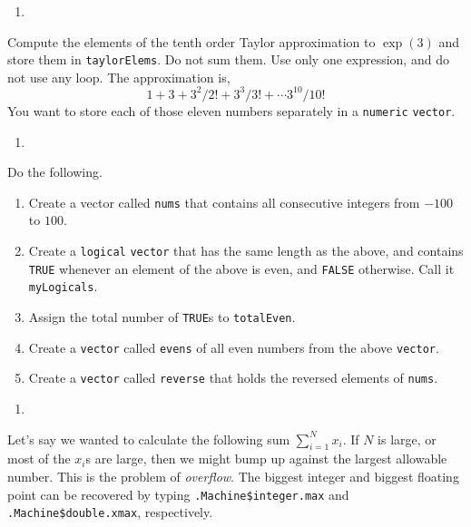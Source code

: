 \documentclass[
  12pt,
  krantz2]{krantz}
\providecommand{\tightlist}{%
  \setlength{\itemsep}{0pt}\setlength{\parskip}{0pt}}
\begin{document}
\begin{enumerate}
\def\labelenumi{\arabic{enumi}.}
\setcounter{enumi}{1}
\tightlist
\item
\end{enumerate}

Compute the elements of the tenth order Taylor approximation to \(\exp(3)\) and store them in \texttt{taylorElems}. Do not sum them. Use only one expression, and do not use any loop. The approximation is,\\
\[
1 + 3 + 3^2/2! + 3^3/3! + \cdots 3^{10}/10!
\]
You want to store each of those eleven numbers separately in a \texttt{numeric} \texttt{vector}.

\begin{enumerate}
\def\labelenumi{\arabic{enumi}.}
\setcounter{enumi}{2}
\tightlist
\item
\end{enumerate}

Do the following.

\begin{enumerate}
\def\labelenumi{\alph{enumi})}
\tightlist
\item
  Create a vector called \texttt{nums} that contains all consecutive integers from \(-100\) to \(100\).
\item
  Create a \texttt{logical} \texttt{vector} that has the same length as the above, and contains \texttt{TRUE} whenever an element of the above is even, and \texttt{FALSE} otherwise. Call it \texttt{myLogicals}.
\item
  Assign the total number of \texttt{TRUE}s to \texttt{totalEven}.
\item
  Create a \texttt{vector} called \texttt{evens} of all even numbers from the above \texttt{vector}.
\item
  Create a \texttt{vector} called \texttt{reverse} that holds the reversed elements of \texttt{nums}.
\end{enumerate}

\begin{enumerate}
\def\labelenumi{\arabic{enumi}.}
\setcounter{enumi}{3}
\tightlist
\item
\end{enumerate}

Let's say we wanted to calculate the following sum \(\sum_{i=1}^N x_i\). If \(N\) is large, or most of the \(x_i\)s are large, then we might bump up against the largest allowable number. This is the problem of \emph{overflow}. The biggest integer and biggest floating point can be recovered by typing \texttt{.Machine\$integer.max} and \texttt{.Machine\$double.xmax}, respectively.
\end{document}
